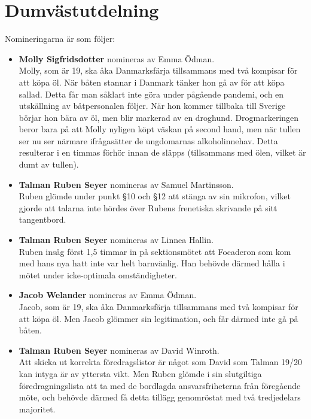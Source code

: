 \documentclass[hidelinks]{sektionsmote}
\begin{document}
\section{Dumvästutdelning}
Nomineringarna är som följer:
\begin{itemize}
  \item \textbf{Molly Sigfridsdotter} nomineras av Emma Ödman.\\
  Molly, som är 19, ska åka Danmarksfärja tillsammans med två kompisar för att köpa öl.
  När båten stannar i Danmark tänker hon gå av för att köpa sallad.
  Detta får man såklart inte göra under pågående pandemi, och en utskällning av båtpersonalen följer.
  När hon kommer tillbaka till Sverige börjar hon bära av öl, men blir markerad av en droghund.
  Drogmarkeringen beror bara på att Molly nyligen köpt väskan på second hand, men när tullen ser nu ser närmare ifrågasätter de ungdomarnas alkoholinnehav.
  Detta resulterar i en timmas förhör innan de släpps (tillsammans med ölen, vilket är dumt av tullen).

  \item \textbf{Talman Ruben Seyer} nomineras av Samuel Martinsson.\\
  Ruben glömde under punkt §10 och §12 att stänga av sin mikrofon, vilket gjorde att talarna inte hördes över Rubens frenetiska skrivande på sitt tangentbord.

  \item \textbf{Talman Ruben Seyer} nomineras av Linnea Hallin.\\
  Ruben insåg först 1,5 timmar in på sektionsmötet att Focaderon som kom med hans nya hatt inte var helt barnvänlig.
  Han behövde därmed hålla i mötet under icke-optimala omständigheter.

  \item \textbf{Jacob Welander} nomineras av Emma Ödman.\\
  Jacob, som är 19, ska åka Danmarksfärja tillsammans med två kompisar för att köpa öl.
  Men Jacob glömmer sin legitimation, och får därmed inte gå på båten.

  \item \textbf{Talman Ruben Seyer} nomineras av David Winroth.\\
  Att skicka ut korrekta föredragslistor är något som David som Talman 19/20 kan intyga är av yttersta vikt.
  Men Ruben glömde i sin slutgiltiga föredragningslista att ta med de bordlagda ansvarsfriheterna från föregående möte, och behövde därmed få detta tillägg genomröstat med två tredjedelars majoritet.


\end{itemize}
\end{document}

